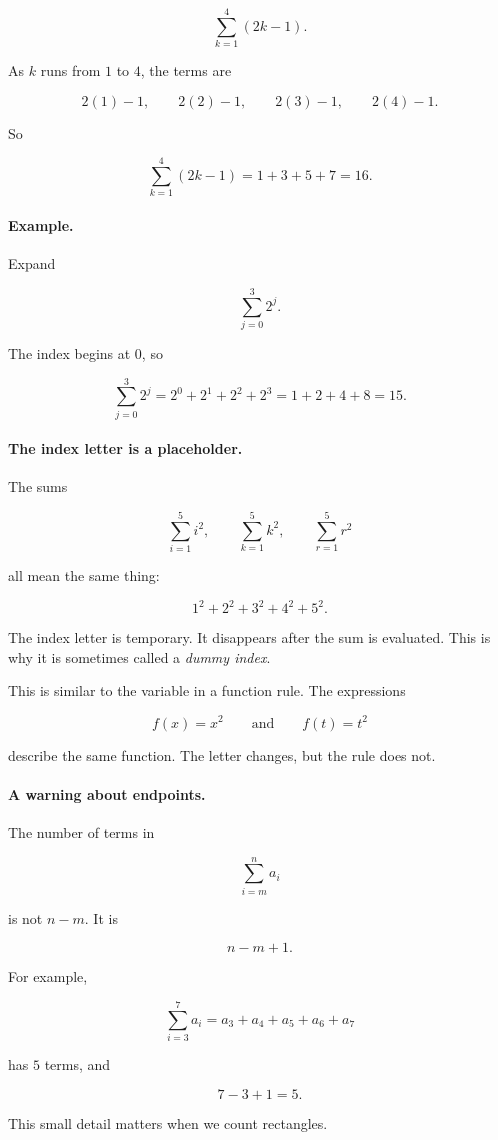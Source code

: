 \[
\sum_{k=1}^{4}(2k-1).
\]

As \(k\) runs from \(1\) to \(4\), the terms are

\[
2(1)-1,\qquad 2(2)-1,\qquad 2(3)-1,\qquad 2(4)-1.
\]

So

\[
\sum_{k=1}^{4}(2k-1)
=
1+3+5+7
=
16.
\]

\paragraph{Example.}
Expand

\[
\sum_{j=0}^{3} 2^j.
\]

The index begins at \(0\), so

\[
\sum_{j=0}^{3} 2^j
=
2^0+2^1+2^2+2^3
=
1+2+4+8
=
15.
\]

\paragraph{The index letter is a placeholder.}
The sums

\[
\sum_{i=1}^{5} i^2,
\qquad
\sum_{k=1}^{5} k^2,
\qquad
\sum_{r=1}^{5} r^2
\]

all mean the same thing:

\[
1^2+2^2+3^2+4^2+5^2.
\]

The index letter is temporary.  It disappears after the sum is evaluated.  This is why it
is sometimes called a \emph{dummy index}.

This is similar to the variable in a function rule.  The expressions

\[
f(x)=x^2
\qquad\text{and}\qquad
f(t)=t^2
\]

describe the same function.  The letter changes, but the rule does not.

\paragraph{A warning about endpoints.}
The number of terms in

\[
\sum_{i=m}^{n} a_i
\]

is not \(n-m\).  It is

\[
n-m+1.
\]

For example,

\[
\sum_{i=3}^{7} a_i
=
a_3+a_4+a_5+a_6+a_7
\]

has \(5\) terms, and

\[
7-3+1=5.
\]

This small detail matters when we count rectangles.

